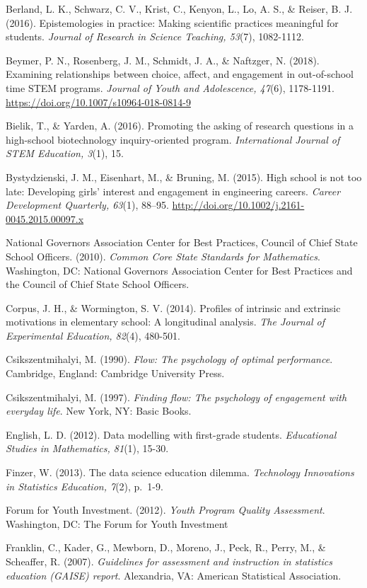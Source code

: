 \documentclass[]{msu-thesis}
\theoremstyle{definition}
\theoremstyle{definition}
\theoremstyle{definition}
\theoremstyle{remark}
\begin{document}
Berland, L. K., Schwarz, C. V., Krist, C., Kenyon, L., Lo, A. S., \&
Reiser, B. J. (2016). Epistemologies in practice: Making scientific
practices meaningful for students. \emph{Journal of Research in Science
Teaching, 53}(7), 1082-1112.

Beymer, P. N., Rosenberg, J. M., Schmidt, J. A., \& Naftzger, N. (2018).
Examining relationships between choice, affect, and engagement in
out-of-school time STEM programs. \emph{Journal of Youth and
Adolescence, 47}(6), 1178-1191.
\url{https://doi.org/10.1007/s10964-018-0814-9}

Bielik, T., \& Yarden, A. (2016). Promoting the asking of research
questions in a high-school biotechnology inquiry-oriented program.
\emph{International Journal of STEM Education, 3}(1), 15.

Bystydzienski, J. M., Eisenhart, M., \& Bruning, M. (2015). High school
is not too late: Developing girls' interest and engagement in
engineering careers. \emph{Career Development Quarterly, 63}(1), 88--95.
\url{http://doi.org/10.1002/j.2161-0045.2015.00097.x}

National Governors Association Center for Best Practices, Council of
Chief State School Officers. (2010). \emph{Common Core State Standards
for Mathematics}. Washington, DC: National Governors Association Center
for Best Practices and the Council of Chief State School Officers.

Corpus, J. H., \& Wormington, S. V. (2014). Profiles of intrinsic and
extrinsic motivations in elementary school: A longitudinal analysis.
\emph{The Journal of Experimental Education, 82}(4), 480-501.

Csikszentmihalyi, M. (1990). \emph{Flow: The psychology of optimal
performance}. Cambridge, England: Cambridge University Press.

Csikszentmihalyi, M. (1997). \emph{Finding flow: The psychology of
engagement with everyday life}. New York, NY: Basic Books.

English, L. D. (2012). Data modelling with first-grade students.
\emph{Educational Studies in Mathematics, 81}(1), 15-30.

Finzer, W. (2013). The data science education dilemma. \emph{Technology
Innovations in Statistics Education, 7}(2), p.~1-9.

Forum for Youth Investment. (2012). \emph{Youth Program Quality
Assessment}. Washington, DC: The Forum for Youth Investment

Franklin, C., Kader, G., Mewborn, D., Moreno, J., Peck, R., Perry, M.,
\& Scheaffer, R. (2007). \emph{Guidelines for assessment and instruction
in statistics education (GAISE) report}. Alexandria, VA: American
Statistical Association.
\end{document}
